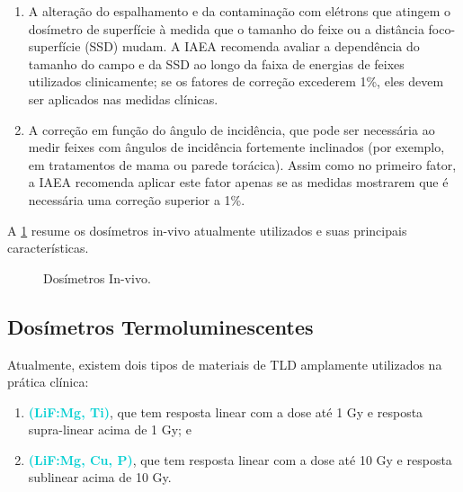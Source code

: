 \documentclass[11pt,a4paper]{article}
\newcounter{exemplo}
\begin{document}
	\begin{enumerate}
		\item A alteração do espalhamento e da contaminação com elétrons que atingem o dosímetro de superfície à medida que o tamanho do feixe ou a distância foco-superfície (SSD) mudam. A IAEA recomenda avaliar a dependência do tamanho do campo e da SSD ao longo da faixa de energias de feixes utilizados clinicamente; se os fatores de correção excederem 1\%, eles devem ser aplicados nas medidas clínicas.
		
		\item A correção em função do ângulo de incidência, que pode ser necessária ao medir feixes com ângulos de incidência fortemente inclinados (por exemplo, em tratamentos de mama ou parede torácica). Assim como no primeiro fator, a IAEA recomenda aplicar este fator apenas se as medidas mostrarem que é necessária uma correção superior a 1\%.
	\end{enumerate}
	
	A \ref{fig:dosimetrosInVivo} resume os dosímetros in-vivo atualmente utilizados e suas principais características.

	\begin{figure}[h]
		\centering
		\caption{Dosímetros In-vivo.}
		\label{fig:dosimetrosInVivo}
	\end{figure}



\subsection*{Dosímetros Termoluminescentes}

	Atualmente, existem dois tipos de materiais de TLD amplamente utilizados na prática clínica:
	
	\begin{enumerate}[label=\textcolor{CarnationPink}{\arabic*${}^\circ $}]
		\item \textcolor{DarkTurquoise}{\textbf{(LiF:Mg, Ti)}}, que tem resposta linear com a dose até 1 Gy e resposta supra-linear acima de 1 Gy; e
		\item \textcolor{DarkTurquoise}{\textbf{(LiF:Mg, Cu, P)}}, que tem resposta linear com a dose até 10 Gy e resposta sublinear acima de 10 Gy.
	\end{enumerate}
	
\end{document}
